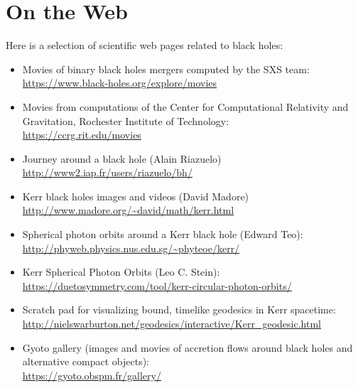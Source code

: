 \chapter{On the Web} \label{s:web}

\minitoc

Here is a selection of scientific web pages related to black holes:

\begin{itemize}
\item Movies of binary black holes mergers computed by the SXS team:\\
\url{https://www.black-holes.org/explore/movies}
\item Movies from computations of the Center for Computational Relativity
and Gravitation, Rochester Institute of Technology:\\
\url{https://ccrg.rit.edu/movies}
\item Journey around a black hole (Alain Riazuelo)\\
\url{http://www2.iap.fr/users/riazuelo/bh/}
\item Kerr black holes images and videos (David Madore)\\
\url{http://www.madore.org/~david/math/kerr.html}
\item Spherical photon orbits around a Kerr black hole (Edward Teo):\\
\url{http://phyweb.physics.nus.edu.sg/~phyteoe/kerr/}
\item Kerr Spherical Photon Orbits (Leo C. Stein):\\
\url{https://duetosymmetry.com/tool/kerr-circular-photon-orbits/}
\item Scratch pad for visualizing bound, timelike geodesics in Kerr spacetime:\\
\url{http://nielswarburton.net/geodesics/interactive/Kerr_geodesic.html}
\item Gyoto gallery (images and movies of accretion flows around black holes and alternative
compact objects): \\
\url{https://gyoto.obspm.fr/gallery/}
\end{itemize}

